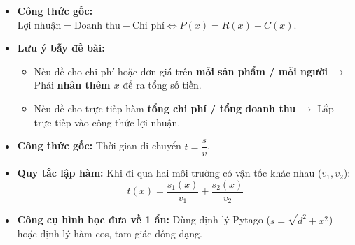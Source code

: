 \documentclass[12pt,a4paper]{article}
\begin{document}

\vspace{0.15cm}

\begin{theorybox}
    \begin{itemize}\setlength{\itemsep}{2pt}
        \item \textbf{Công thức gốc:} $\text{Lợi nhuận} = \text{Doanh thu} - \text{Chi phí} \iff P(x) = R(x) - C(x)$.
        \item \textbf{Lưu ý bẫy đề bài:}
        \begin{itemize}\setlength{\itemsep}{1pt}
            \item Nếu đề cho chi phí hoặc đơn giá trên \textbf{mỗi sản phẩm / mỗi người} $\longrightarrow$ Phải \textbf{nhân thêm $x$} để ra tổng số tiền.
            \item Nếu đề cho trực tiếp hàm \textbf{tổng chi phí / tổng doanh thu} $\longrightarrow$ Lắp trực tiếp vào công thức lợi nhuận.
        \end{itemize}
    \end{itemize}
\end{theorybox}


\drawdashlinesfull


\vspace{0.15cm}

\begin{theorybox}
    \begin{itemize}\setlength{\itemsep}{2pt}
        \item \textbf{Công thức gốc:} Thời gian di chuyển $t = \dfrac{s}{v}$.
        \item \textbf{Quy tắc lập hàm:} Khi đi qua hai môi trường có vận tốc khác nhau ($v_1, v_2$):
        \[
            t(x) = \frac{s_1(x)}{v_1} + \frac{s_2(x)}{v_2}
        \]
        \item \textbf{Công cụ hình học đưa về 1 ẩn:} Dùng định lý Pytago ($s = \sqrt{d^2 + x^2}$) hoặc định lý hàm cos, tam giác đồng dạng.
    \end{itemize}
\end{theorybox}
\end{document}
